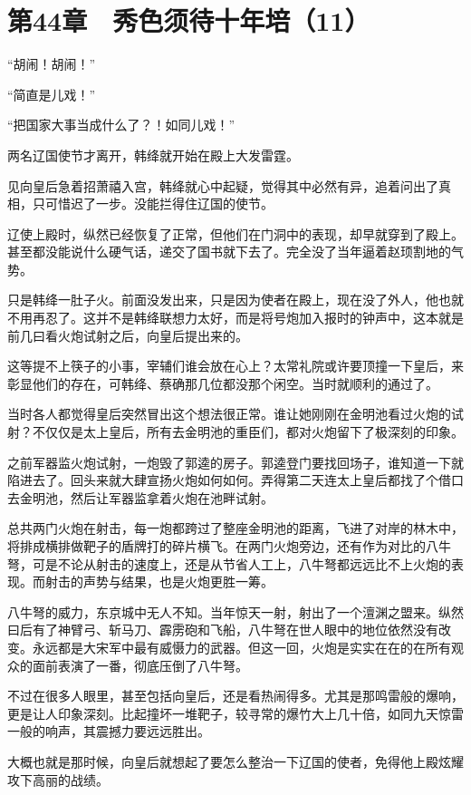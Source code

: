 \section{第44章　秀色须待十年培（11）}

“胡闹！胡闹！”

“简直是儿戏！”

“把国家大事当成什么了？！如同儿戏！”

两名辽国使节才离开，韩绛就开始在殿上大发雷霆。

见向皇后急着招萧禧入宫，韩绛就心中起疑，觉得其中必然有异，追着问出了真相，只可惜迟了一步。没能拦得住辽国的使节。

辽使上殿时，纵然已经恢复了正常，但他们在门洞中的表现，却早就穿到了殿上。甚至都没能说什么硬气话，递交了国书就下去了。完全没了当年逼着赵顼割地的气势。

只是韩绛一肚子火。前面没发出来，只是因为使者在殿上，现在没了外人，他也就不用再忍了。这并不是韩绛联想力太好，而是将号炮加入报时的钟声中，这本就是前几曰看火炮试射之后，向皇后提出来的。

这等提不上筷子的小事，宰辅们谁会放在心上？太常礼院或许要顶撞一下皇后，来彰显他们的存在，可韩绛、蔡确那几位都没那个闲空。当时就顺利的通过了。

当时各人都觉得皇后突然冒出这个想法很正常。谁让她刚刚在金明池看过火炮的试射？不仅仅是太上皇后，所有去金明池的重臣们，都对火炮留下了极深刻的印象。

之前军器监火炮试射，一炮毁了郭逵的房子。郭逵登门要找回场子，谁知道一下就陷进去了。回头来就大肆宣扬火炮如何如何。弄得第二天连太上皇后都找了个借口去金明池，然后让军器监拿着火炮在池畔试射。

总共两门火炮在射击，每一炮都跨过了整座金明池的距离，飞进了对岸的林木中，将排成横排做靶子的盾牌打的碎片横飞。在两门火炮旁边，还有作为对比的八牛弩，可是不论从射击的速度上，还是从节省人工上，八牛弩都远远比不上火炮的表现。而射击的声势与结果，也是火炮更胜一筹。

八牛弩的威力，东京城中无人不知。当年惊天一射，射出了一个澶渊之盟来。纵然曰后有了神臂弓、斩马刀、霹雳砲和飞船，八牛弩在世人眼中的地位依然没有改变。永远都是大宋军中最有威慑力的武器。但这一回，火炮是实实在在的在所有观众的面前表演了一番，彻底压倒了八牛弩。

不过在很多人眼里，甚至包括向皇后，还是看热闹得多。尤其是那鸣雷般的爆响，更是让人印象深刻。比起撞坏一堆靶子，较寻常的爆竹大上几十倍，如同九天惊雷一般的响声，其震撼力要远远胜出。

大概也就是那时候，向皇后就想起了要怎么整治一下辽国的使者，免得他上殿炫耀攻下高丽的战绩。

